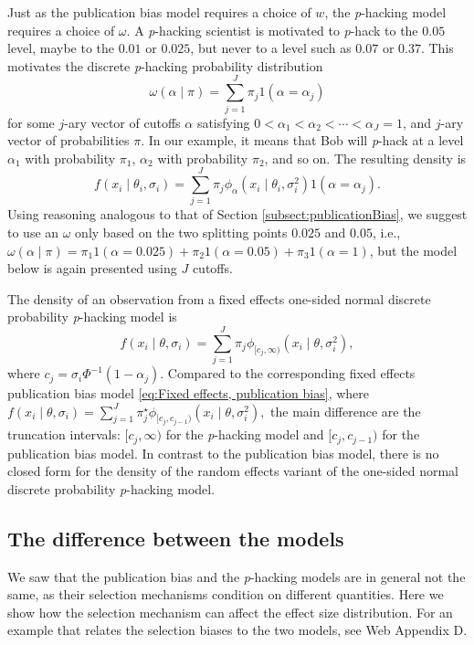 \documentclass[useAMS,usenatbib,referee]{biom}
\begin{document}
Just as the publication bias model requires a choice of $w$, the \textit{p}-hacking model requires a choice of $\omega$. A \textit{p}-hacking scientist is motivated to \textit{p}-hack to the $0.05$ level, maybe to the $0.01$ or $0.025$, but never to a level such as $0.07$ or $0.37$. This motivates the discrete \textit{p}-hacking probability distribution
$$\omega(\alpha\mid\pi)=\sum_{j=1}^{J}\pi_{j}1(\alpha = \alpha_j)$$
for some $j$-ary vector of cutoffs $\alpha$ satisfying $0<\alpha_{1}<\alpha_{2}<\cdots<\alpha_{J}=1$,
and $j$-ary vector of probabilities $\pi$. In our example, it means that Bob will \textit{p}-hack at a level $\alpha_1$ with probability $\pi_1$, $\alpha_{2}$ with probability $\pi_{2}$, and so on. The resulting density is 
\[
f(x_{i}\mid\theta_{i},\sigma_{i})=\sum_{j=1}^{J}\pi_{j}\phi_\alpha(x_{i}\mid\theta_{i},\sigma^2_{i})1(\alpha = \alpha_j).
\]
Using reasoning analogous to that of Section \ref{subsect:publicationBias}, we suggest to use an $\omega$ only based on the two splitting points $0.025$ and $0.05$, i.e.,  $\omega(\alpha\mid\pi) = \pi_1 1(\alpha = 0.025) + \pi_{2}1(\alpha = 0.05) + \pi_{3}1(\alpha = 1)$, but the model below is again presented using $J$ cutoffs.

The density of an observation from a fixed effects one-sided normal discrete probability \textit{p}-hacking model is
\begin{equation*}
f(x_{i}\mid\theta,\sigma_{i}) = \sum_{j=1}^{J}\pi_{j}\phi_{[c_{j}, \infty)}(x_{i}\mid\theta,\sigma_{i}^2),
\end{equation*}
where $c_{j}=\sigma_i\Phi^{-1}(1-\alpha_{j})$. Compared to the corresponding fixed effects publication bias model \eqref{eq:Fixed effects, publication bias}, where $f(x_{i}\mid\theta,\sigma_{i}) = \sum_{j=1}^{J}\pi^\star_{j}\phi_{[c_{j},c_{j-1})}(x_{i}\mid\theta,\sigma_{i}^2),$ the main difference are the truncation intervals: $[c_{j}, \infty)$ for the \textit{p}-hacking model and $[c_{j},c_{j-1})$ for the publication bias model. In contrast to the publication bias model, there is no closed form for the density of the random effects variant of the one-sided normal discrete probability \textit{p}-hacking model. 

\subsection{The difference between the models\label{subsec:Selection sets, meta analysis}}

We saw that the publication bias and the \textit{p}-hacking models are in general not the same, as their selection mechanisms condition on different quantities. Here we show how the selection mechanism can affect the effect size distribution. For an example that relates the selection biases to the two models, see Web Appendix D.
\end{document}
